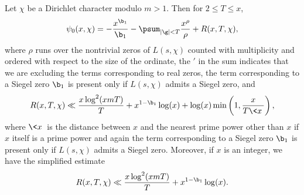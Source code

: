       \begin{corollary}\label{cor:explicit_formula_Dirichlet_corollary}
         Let $\chi$ be a Dirichlet character modulo $m > 1$. Then for $2 \le T \le x$,
        \[
          \psi_{0}(x,\chi) = -\frac{x^{\b_{1}}}{\b_{1}}-\psum_{|\g| < T}\frac{x^{\rho}}{\rho}+R(x,T,\chi),
        \]
        where $\rho$ runs over the nontrivial zeros of $L(s,\chi)$ counted with multiplicity and ordered with respect to the size of the ordinate, the $'$ in the sum indicates that we are excluding the terms corresponding to real zeros, the term corresponding to a Siegel zero $\b_{1}$ is present only if $L(s,\chi)$ admits a Siegel zero, and
        \[
          R(x,T,\chi) \ll \frac{x\log^{2}(xmT)}{T}+x^{1-\b_{1}}\log(x)+\log(x)\min\left(1,\frac{x}{T\<x\>}\right),
        \]
        where $\<x\>$ is the distance between $x$ and the nearest prime power other than $x$ if $x$ itself is a prime power and again the term corresponding to a Siegel zero $\b_{1}$ is present only if $L(s,\chi)$ admits a Siegel zero. Moreover, if $x$ is an integer, we have the simplified estimate
        \[
          R(x,T,\chi) \ll \frac{x\log^{2}(xmT)}{T}+x^{1-\b_{1}}\log(x).
        \]
      \end{corollary}
